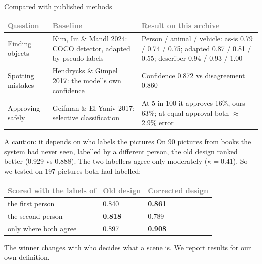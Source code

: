 \documentclass[aspectratio=169,11pt]{beamer}
\newcommand{\h}[1]{\textcolor{grey}{#1}}
\newcommand{\remark}[1]{\par\vspace{0.35cm}{\small\textcolor{grey}{#1}}}
\begin{document}
\begin{frame}{Compared with published methods}
\small
\begin{tabular}{@{}L{2.4cm} L{3.6cm} L{6.2cm}@{}}
\toprule
\h{Question} & \h{Baseline} & \h{Result on this archive}\\
\midrule
Finding objects & Kim, Im \& Mandl 2024: COCO detector, adapted by pseudo-labels & Person / animal / vehicle: as-is 0.79 / 0.74 / 0.75; adapted 0.87 / 0.81 / 0.55; describer 0.94 / 0.93 / 1.00\\
Spotting mistakes & Hendrycks \& Gimpel 2017: the model's own confidence & Confidence 0.872 vs disagreement 0.860\\
Approving safely & Geifman \& El-Yaniv 2017: selective classification & At 5 in 100 it approves 16\%, ours 63\%; at equal approval both $\approx$ 2.9\% error\\
\bottomrule
\end{tabular}
\remark{Our risk method is not a better ranker; it gives an average guarantee in exchange for more automatic approval.}
\end{frame}

\begin{frame}{A caution: it depends on who labels the pictures}
On 90 pictures from books the system had never seen, labelled by a different person, the old design ranked better (0.929 vs 0.888). The two labellers agree only moderately ($\kappa = 0.41$). So we tested on 197 pictures both had labelled:

\vspace{0.3cm}
\begin{tabular}{@{}L{6cm} C{3cm} C{3cm}@{}}
\toprule
\h{Scored with the labels of} & \h{Old design} & \h{Corrected design}\\
\midrule
the first person & 0.840 & \textbf{0.861}\\
the second person & \textbf{0.818} & 0.789\\
only where both agree & 0.897 & \textbf{0.908}\\
\bottomrule
\end{tabular}

\vspace{0.3cm}
The winner changes with who decides what a scene is. We report results for our own definition.
\end{frame}
\end{document}

